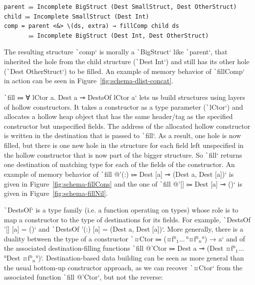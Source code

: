 \documentclass[english]{jflart}
\newlength{\currentparskip}
\newenvironment{unbreakable}
{%
  \setlength{\currentparskip}{\parskip}%
  \setlength{\parskip}{\currentparskip}%
  \par\vspace{0.5\baselineskip}%
  \noindent\begin{minipage}{\textwidth}%
    \setlength{\parskip}{\currentparskip}%
}
{%
  \end{minipage}%
  \par\vspace{0.5\baselineskip}%
}
\begin{document}
\begin{unbreakable}
{\small
\begin{verbatim}
parent ⩴ Incomplete BigStruct (Dest SmallStruct, Dest OtherStruct)
child ⩴ Incomplete SmallStruct (Dest Int)
comp = parent <&> \(ds, extra) → fillComp child ds
       ⩴ Incomplete BigStruct (Dest Int, Dest OtherStruct)
\end{verbatim}
}
\end{unbreakable}

The resulting structure \texttt`comp` is morally a \texttt`BigStruct` like \texttt`parent`, that inherited the hole from the child structure (\texttt`Dest Int`) and still has its other hole (\texttt`Dest OtherStruct`) to be filled. An example of memory behavior of \texttt`fillComp` in action can be seen in Figure~\ref{fig:schema-dlist-concat}.

\texttt`fill ⩴ ∀ lCtor a. Dest a ⊸ DestsOf lCtor a` lets us build structures using layers of hollow constructors. It takes a constructor as a type parameter (\texttt`lCtor`) and allocates a hollow heap object that has the same header/tag as the specified constructor but unspecified fields. The address of the allocated hollow constructor is written in the destination that is passed to \texttt`fill`. As a result, one hole is now filled, but there is one new hole in the structure for each field left unspecified in the hollow constructor that is now part of the bigger structure. So \texttt`fill` returns one destination of matching type for each of the fields of the constructor. An example of memory behavior of \texttt`fill @'(:) ⩴ Dest [a] ⊸ (Dest a, Dest [a])` is given in Figure~\ref{fig:schema-fillCons} and the one of \texttt`fill @'[] ⩴ Dest [a] ⊸ ()` is given in Figure~\ref{fig:schema-fillNil}.

\texttt`DestsOf` is a type family (i.e. a function operating on types) whose role is to map a constructor to the type of destinations for its fields. For example, \texttt`DestsOf '[] [a] = ()` and \texttt`DestsOf '(:) [a] = (Dest a, Dest [a])`. More generally, there is a duality between the type of a constructor \texttt`¤Ctor ⩴ (¤f°$_1\ldots\,$°¤f°$_n$°) → a` and of the associated destination-filling functions \texttt`fill @'Ctor ⩴ Dest a ⊸ (Dest ¤f°$_1\ldots\,$°Dest ¤f°$_n$°)`. Destination-based data building can be seen as more general than the usual bottom-up constructor approach, as we can recover \texttt`¤Ctor` from the associated function \texttt`fill @'Ctor`, but not the reverse:
\end{document}
